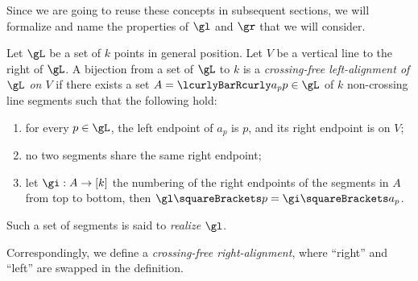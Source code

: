 \documentclass[10pt, a4paper, twoside]{basestyle}
\begin{document}
Since we are going to reuse these concepts in subsequent sections, we will formalize and name the properties of
$\gl$ and $\gr$ that we will consider.
\begin{definition}
Let $\gL$ be a set of $k$ points in general position. Let $V$ be a vertical line to the right of $\gL$.
A bijection from a set of $\gL$ to $k$ is a \emph{crossing-free left-alignment of $\gL$ on $V$} if
there exists a set $A=\setst{a_p}{p\in\gL}$ of $k$ non-crossing line segments such that
the following hold:
\begin{enumerate}
\item for every $p\in\gL$, the left endpoint of $a_p$ is $p$, and its right endpoint is on $V$;
\item no two segments share the same right endpoint;
\item let $\FunctionSpec \gi A {[k]}$ the numbering of the right endpoints of the segments in
$A$ from top to bottom, then $\gl\of p = \gi\of{a_p}$.
\end{enumerate}
Such a set of segments is said to \emph{realize} $\gl$.

Correspondingly, we define a \emph{crossing-free right-alignment}, where ``right'' and ``left'' are swapped in the
definition.
\end{definition}
\end{document}
